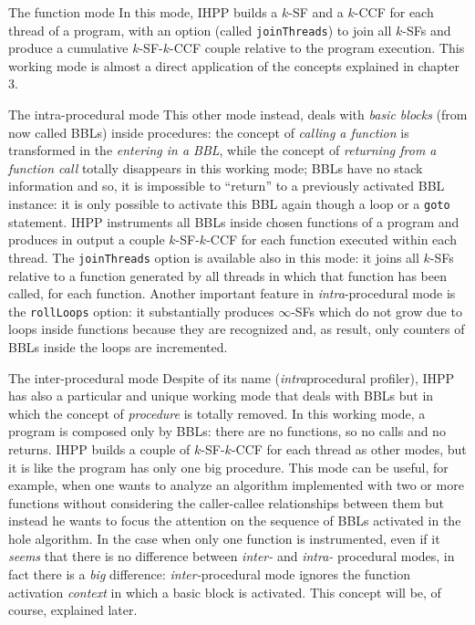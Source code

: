 \documentclass[a4paper,10pt]{report}
\begin{document}
\begin{paragraph}{The function mode}
In this mode, IHPP builds a $k$-SF and a $k$-CCF for each thread of a program,
with an option (called \verb|joinThreads|) to join all $k$-SFs and produce a cumulative $k$-SF-$k$-CCF couple relative to the program execution.
This working mode is almost a direct application of the concepts explained in chapter 3. 
\end{paragraph}

\begin{paragraph}{The intra-procedural mode}
This other mode instead, deals with \emph{basic blocks} (from now called BBLs) inside procedures: the concept of \emph{calling a function} is transformed in the \emph{entering in a BBL}, while the concept of \emph{returning from a function call} totally disappears in this working mode; BBLs have no stack information and so, it is impossible to ``return'' to a previously activated BBL instance: it is only possible to activate this BBL again though a loop or a \verb|goto| statement.
IHPP instruments all BBLs inside chosen functions of a program and produces in output a couple $k$-SF-$k$-CCF for each function executed within each thread. The \verb|joinThreads| option is available also in this mode: it joins all $k$-SFs relative to a function generated by all threads in which that function has been called, for each function.
Another important feature in \emph{intra}-procedural mode is the \verb|rollLoops| option: it substantially produces $\infty$-SFs which do not grow due to loops inside functions because they are recognized and, as result, only counters of BBLs inside the loops are incremented. 
\end{paragraph}

\begin{paragraph}{The inter-procedural mode}
Despite of its name (\emph{intra}procedural profiler), IHPP has also a particular and unique working mode that deals with BBLs but in which the concept of \emph{procedure} is totally removed. In this working mode, a program is composed only by BBLs: there are no functions, so no calls and no returns. IHPP builds a couple of $k$-SF-$k$-CCF for each thread as other modes, but it is like the program has only one big procedure. This mode can be useful, for example, when one wants to analyze an algorithm implemented with two or more functions without considering the caller-callee relationships between them but instead he wants to focus the attention on the sequence of BBLs activated in the hole algorithm. In the case when only one function is instrumented, even if it \emph{seems} that there is no difference between \emph{inter-} and \emph{intra-} procedural modes, in fact there is a \emph{big} difference: \emph{inter-}procedural mode ignores 
the function activation \emph{context} in which a basic block is activated. 
This concept will be, of course, explained later.
\end{paragraph}
\end{document}
